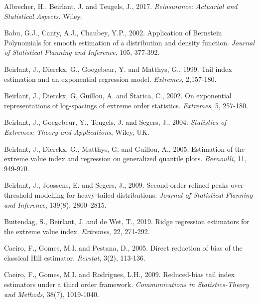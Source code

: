 \documentclass[twoside,leqno,11pt]{article}
\begin{document}
\begin{thebibliography}{99}
Albrecher, H., Beirlant, J. and Teugels, J., 2017. {\it Reinsurance: Actuarial and Statistical Aspects.} Wiley.


Babu, G.J., Canty, A.J., Chaubey, Y.P., 2002. Application of Bernstein Polynomials for smooth estimation of a distribution and density function. {\it Journal of Statistical Planning and Inference}, 105, 377-392.

Beirlant, J., Dierckx, G., Goegebeur, Y. and  Matthys, G., 1999. Tail index estimation and an exponential regression model. {\it Extremes}, 2,157-180.



Beirlant, J., Dierckx, G, Guillou, A. and Starica, C., 2002. On exponential representations of log-spacings of extreme order statistics. {\it Extremes}, 5, 257-180.


Beirlant, J., Goegebeur, Y., Teugels, J. and Segers, J., 2004. {\it Statistics of Extremes: Theory and Applications}, Wiley, UK.

Beirlant, J., Dierckx, G., Matthys, G. and Guillou, A., 2005. Estimation of the extreme value index and regression on generalized quantile
plots.  {\it Bernoulli}, 11, 949-970.

Beirlant, J., Joossens, E. and Segers, J., 2009.
 Second-order refined peaks-over-threshold modelling for heavy-tailed distributions. {\it Journal of Statistical Planning and Inference}, 139(8), 2800--2815.
 
 Buitendag, S., Beirlant, J. and de Wet, T., 2019. Ridge regression estimators for the extreme value index. {\it Extremes}, 22, 271-292.
 

Caeiro, F., Gomes, M.I. and Pestana, D., 2005. Direct reduction of bias of the classical Hill estimator. {\it Revstat}, 3(2), 113-136.

Caeiro, F., Gomes, M.I. and Rodrigues, L.H.,  2009. Reduced-bias tail index estimators under a third order framework. {\it Communications in Statistics-Theory and Methods}, 38(7), 1019-1040.


\end{thebibliography}
\end{document}
